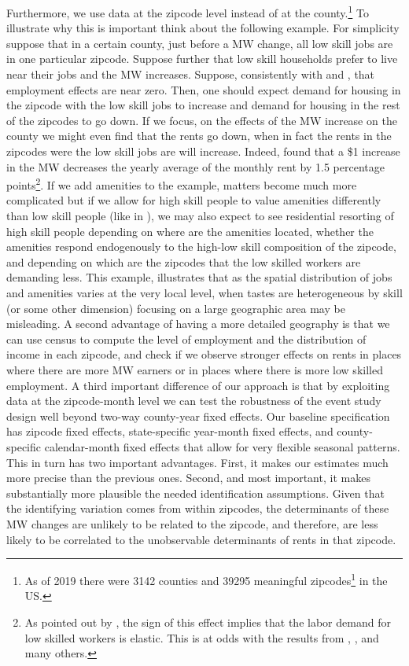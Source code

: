 Furthermore, we use data at the zipcode level instead of at the county.\footnote{As of 2019 there were 3142 counties and 39295 meaningful zipcodes\footnote{We exclude military and unique business zipcodes as they are irrelevant for house prices.} in the US.} To illustrate why this is important think about the following example. For simplicity suppose that in a certain county, just before a MW change, all low skill jobs are in one particular zipcode. Suppose further that low skill households prefer to live near their jobs and the MW increases. Suppose, consistently with \textcite{card2000minimum} and \textcite{cengiz2019effect}, that employment effects are near zero. Then, one should expect demand for housing in the zipcode with the low skill jobs to increase and demand for housing in the rest of the zipcodes to go down. If we focus, on the effects of the MW increase on the county we might even find that the rents go down, when in fact the rents in the zipcodes were the low skill jobs are will increase. Indeed, \textcite{tidemann2018mw} found that a \$1 increase in the MW decreases the yearly average of the monthly rent by 1.5 percentage points\footnote{As pointed out by \textcite{tidemann2018mw}, the sign of this effect implies that the labor demand for low skilled workers is elastic. This is at odds with the results from \textcite{card2000minimum}, \textcite{cengiz2019effect}, and many others.}. If we add amenities to the example, matters become much more complicated but if we allow for high skill people to value amenities differently than low skill people (like in \textcite{diamond2016determinants}), we may also expect to see residential resorting of high skill people depending on where are the amenities located, whether the amenities respond endogenously to the high-low skill composition of the zipcode, and depending on which are the zipcodes that the low skilled workers are demanding less. This example, illustrates that as the spatial distribution of jobs and amenities varies at the very local level, when tastes are heterogeneous by skill (or some other dimension) focusing on a large geographic area may be misleading. A second advantage of having a more detailed geography is that we can use census to compute the level of employment and the distribution of income in each zipcode, and check if we observe stronger effects on rents in places where there are more MW earners or in places where there is more low skilled employment. 
A third important difference of our approach is that by exploiting data at the zipcode-month level we can test the robustness of the event study design well beyond two-way county-year fixed effects. Our baseline specification has zipcode fixed effects, state-specific year-month fixed effects, and county-specific calendar-month fixed effects that allow for very flexible seasonal patterns. This in turn has two important advantages. First, it makes our estimates much more precise than the previous ones. Second, and most important, it makes substantially more plausible the needed identification assumptions. Given that the identifying variation comes from within zipcodes, the determinants of these MW changes are unlikely to be related to the zipcode, and therefore, are less likely to be correlated to the unobservable determinants of rents in that zipcode.

